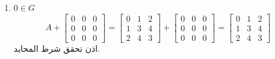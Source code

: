 \begin{example}
\begin{enumerate}[label=\textbf{\xslalph*)}, leftmargin=*]
		\begin{align*}
			A + (B + C) &=
			\begin{bmatrix}
				0&1&2\\
				1&3&4\\
				2&4&3
			\end{bmatrix}
			+
			\left(
			\begin{bmatrix}
				1&2&3\\
				2&5&7\\
				3&7&5
			\end{bmatrix}
			+
			\begin{bmatrix}
				2&1&3\\
				1&3&2\\
				3&2&1
			\end{bmatrix}
			\right) \\
			&=
			\begin{bmatrix}
				0&1&2\\
				1&3&4\\
				2&4&3
			\end{bmatrix}
			+
			\begin{bmatrix}
				3&3&6\\
				3&8&9\\
				6&9&6
			\end{bmatrix} \\
			&=
			\begin{bmatrix}
				3&4&8\\
				4&11&13\\
				8&13&9
			\end{bmatrix}
		\end{align*}
		اذن تحقق شرط التجميعية.
		
		\item $0 \in G$
		\[
		A + 
		\begin{bmatrix}
			0&0&0\\
			0&0&0\\
			0&0&0
		\end{bmatrix} = 
		\begin{bmatrix}
			0&1&2\\
			1&3&4\\
			2&4&3
		\end{bmatrix} + 
		\begin{bmatrix}
			0&0&0\\
			0&0&0\\
			0&0&0
		\end{bmatrix}
		= 
		\begin{bmatrix}
			0&1&2\\
			1&3&4\\
			2&4&3
		\end{bmatrix}
		\]
		اذن تحقق شرط المحايد.
		

\end{enumerate}
\end{example}
